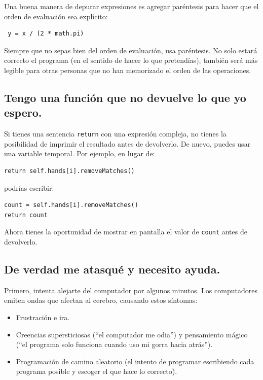 \documentclass[10pt]{book}
\begin{document}
Una buena manera de depurar expresiones es agregar paréntesis para hacer
que el orden de evaluación sea explícito:

\begin{verbatim}
 y = x / (2 * math.pi)
\end{verbatim}
%
Siempre que no sepas bien del orden de evaluación, usa
paréntesis.  No solo estará correcto el programa (en el sentido
de hacer lo que pretendías), también será más legible para
otras personas que no han memorizado el orden de las operaciones.


\subsection{Tengo una función que no devuelve lo que
yo espero.}

Si tienes una sentencia {\tt return} con una expresión compleja,
no tienes la posibilidad de imprimir el resultado antes de
devolverlo.  De nuevo, puedes usar una variable temporal.  Por
ejemplo, en lugar de:

\begin{verbatim}
return self.hands[i].removeMatches()
\end{verbatim}
%
podrías escribir:

\begin{verbatim}
count = self.hands[i].removeMatches()
return count
\end{verbatim}
%
Ahora tienes la oportunidad de mostrar en pantalla el valor de
{\tt count} antes de devolverlo.


\subsection{De verdad me atasqué y necesito ayuda.}

Primero, intenta alejarte del computador por algunos minutos.
Los computadores emiten ondas que afectan al cerebro, causando estos
síntomas:

\begin{itemize}

\item Frustración e ira.

\item Creencias supersticiosas (``el computador me odia'') y
pensamiento mágico (``el programa solo funciona cuando uso mi
gorra hacia atrás'').

\item Programación de camino aleatorio (el intento de programar escribiendo
cada programa posible y escoger el que hace lo
correcto).

\end{itemize}
\end{document}
